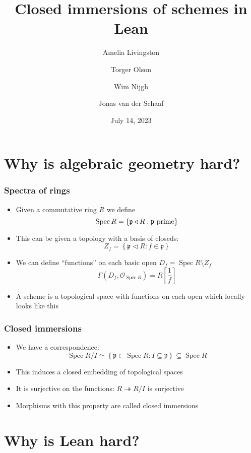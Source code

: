 \documentclass{beamer}
\title{Closed immersions of schemes in Lean}
\author{Amelia Livingston \and Torger Olson \and Wim Nijgh \and Jonas van der Schaaf}
\date{July 14, 2023}
\newcommand{\sheaf}{\mathcal{O}}
\newcommand{\primeid}{\mathfrak{p}}
\newcommand{\setwith}[2]{\left\{#1:#2\right\}}
\DeclareMathOperator{\spec}{Spec}
\newcommand{\ideal}{\triangleleft}
\begin{document}
\maketitle

\section{Why is algebraic geometry hard?}

\begin{frame}
    \frametitle{Spectra of rings}

    \begin{itemize}
        \item Given a commutative ring \(R\) we define
              \[
                  \spec R=\setwith{\primeid\ideal R}{\textnormal{\(\primeid\) prime}}
              \]
        \item This can be given a topology with a basis of closeds:
              \[
                  Z_{f}=\setwith{\primeid\ideal R}{f\in\primeid}
              \]
        \item We can define ``functions'' on each basic open \(D_{f}=\spec
              R\setminus Z_{f}\)
              \[
                  \Gamma(D_{f},\sheaf_{\spec R})=R\left[\frac{1}{f}\right]
              \]
        \item A scheme is a topological space with functions on each open which
              locally looks like this
    \end{itemize}

\end{frame}

\begin{frame}
    \frametitle{Closed immersions}

    \begin{itemize}
        \item We have a correspondence:
              \[
                  \spec R/I\simeq\setwith{\primeid\in\spec R}{I\subseteq\primeid}\subseteq\spec R
              \]

        \item This induces a closed embedding of topological spaces

        \item It is surjective on the functions: \(R\twoheadrightarrow R/I\) is
              surjective

        \item Morphisms with this property are called closed immersions
    \end{itemize}

\end{frame}

\section{Why is Lean hard?}
\end{document}
